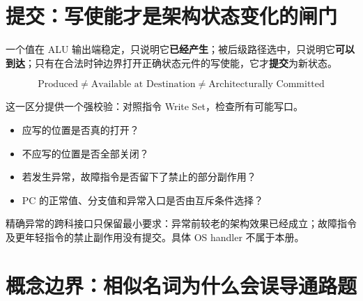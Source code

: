 \documentclass[UTF8,fontset=fandol,11pt,a4paper]{ctexart}
\newcommand{\kw}[1]{\textbf{\color{deep}#1}}
\begin{document}
\section{提交：写使能才是架构状态变化的闸门}

一个值在 ALU 输出端稳定，只说明它\kw{已经产生}；被后级路径选中，只说明它\kw{可以到达}；只有在合法时钟边界打开正确状态元件的写使能，它才\kw{提交}为新状态。

\[
\boxed{
\text{Produced}
\neq
\text{Available at Destination}
\neq
\text{Architecturally Committed}
}
\]

这一区分提供一个强校验：对照指令 Write Set，检查所有可能写口。
\begin{itemize}
  \item 应写的位置是否真的打开？
  \item 不应写的位置是否全部关闭？
  \item 若发生异常，故障指令是否留下了禁止的部分副作用？
  \item PC 的正常值、分支值和异常入口是否由互斥条件选择？
\end{itemize}

精确异常的跨科接口只保留最小要求：异常前较老的架构效果已经成立；故障指令及更年轻指令的禁止副作用没有提交。具体 OS handler 不属于本册。

\section{概念边界：相似名词为什么会误导通路题}
\end{document}
